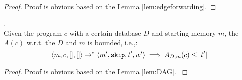%
{
\begin{proof}
Proof is obvious based on the Lemma \ref{lem:edgeforwarding}.
\end{proof}
}
%
\begin{lem}
.
\\
{
Given the program $c$ with a certain database $D$ and starting memory $m$, the $A(c)$ w.r.t. the $D$ and $m$ is bounded, i.e.,:
%
\[
\langle m, c, [], [] \rangle 
\rightarrow^{*} 
\langle m', \mathtt{skip}, t', w' \rangle 
\implies
A_{D, m}(c) \leq |t'|
\]
}
\end{lem}
%
\begin{proof}
{
Proof is obvious based on the Lemma \ref{lem:DAG}.
}
\end{proof}
%
%
\clearpage
%
%
% 
%
\clearpage
